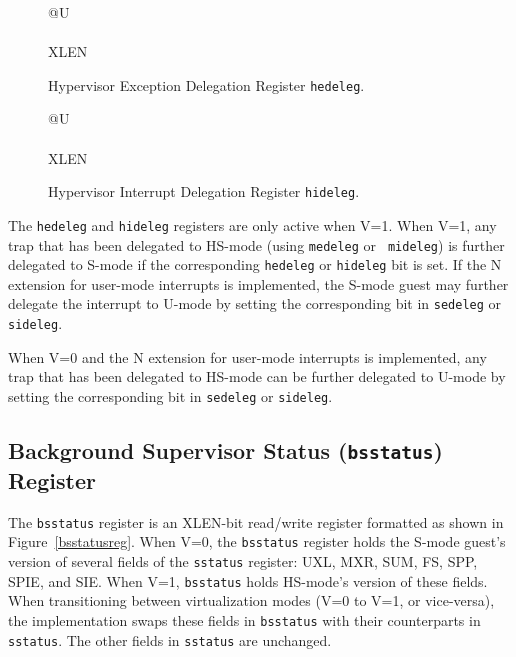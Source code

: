 \begin{figure}[h!]
{\footnotesize
\begin{center}
\begin{tabular}{@{}U}
 \\
\hline
{} \\
\hline
XLEN \\
\end{tabular}
\end{center}
}
\vspace{-0.1in}
\caption{Hypervisor Exception Delegation Register {\tt hedeleg}.}
\label{hedelegreg}
\end{figure}

\begin{figure}[h!]
{\footnotesize
\begin{center}
\begin{tabular}{@{}U}
 \\
\hline
{} \\
\hline
XLEN \\
\end{tabular}
\end{center}
}
\vspace{-0.1in}
\caption{Hypervisor Interrupt Delegation Register {\tt hideleg}.}
\label{hidelegreg}
\end{figure}

The {\tt hedeleg} and {\tt hideleg} registers are only active when V=1.  When
V=1, any trap that has been delegated to HS-mode (using {\tt medeleg} or {\tt
mideleg}) is further delegated to S-mode if the corresponding {\tt hedeleg} or
{\tt hideleg} bit is set.  If the N extension for user-mode interrupts
is implemented, the S-mode guest may further delegate the interrupt
to U-mode by setting the corresponding bit in {\tt sedeleg} or {\tt sideleg}.

When V=0 and the N extension for user-mode interrupts is implemented, any trap
that has been delegated to HS-mode can be further delegated to U-mode by
setting the corresponding bit in {\tt sedeleg} or {\tt sideleg}.

\subsection{Background Supervisor Status ({\tt bsstatus}) Register}

The {\tt bsstatus} register is an XLEN-bit read/write register formatted as
shown in Figure~\ref{bsstatusreg}.  When V=0, the {\tt bsstatus} register
holds the S-mode guest's version of several fields of the {\tt sstatus}
register: UXL, MXR, SUM, FS, SPP, SPIE, and SIE.  When V=1, {\tt bsstatus}
holds HS-mode's version of these fields.  When transitioning between
virtualization modes (V=0 to V=1, or vice-versa), the implementation swaps
these fields in {\tt bsstatus} with their counterparts in {\tt sstatus}.  The
other fields in {\tt sstatus} are unchanged.

